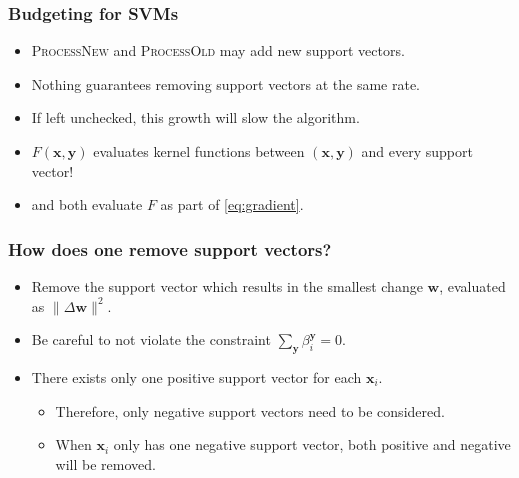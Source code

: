 \begin{frame}
    \frametitle{Budgeting for SVMs}
    \begin{itemize}
        \item \textsc{ProcessNew} and \textsc{ProcessOld} may add new support vectors.
        \item Nothing guarantees removing support vectors at the same rate. 
        \item<2-> If left unchecked, this growth will slow the algorithm.
        \item<2-> \(F(\mathbf{x}, \mathbf{y})\) evaluates kernel functions between \((\mathbf{x},
            \mathbf{y})\) and every support vector!
        \item<2-> \processNew and \processOld both evaluate \(F\) as part of \eqref{eq:gradient}.
    \end{itemize}

\end{frame}

\begin{frame}
    \frametitle{How does one remove support vectors?}
    \begin{itemize}
        \item Remove the support vector which results in the smallest change \(\mathbf{w}\), evaluated as
            \(\|\Delta \mathbf{w}\|^2\).
        \item Be careful to not violate the constraint \(\sum_\mathbf{y} \beta_i^\mathbf{y} = 0\).
        \item There exists only one positive support vector for each \(\mathbf{x}_i\).
            \begin{itemize}
                \item Therefore, only negative support vectors need to be considered.
                \item When \(\mathbf{x}_i\) only has one negative support vector, both positive and
                    negative will be removed.
            \end{itemize}
    \end{itemize}
\end{frame}

